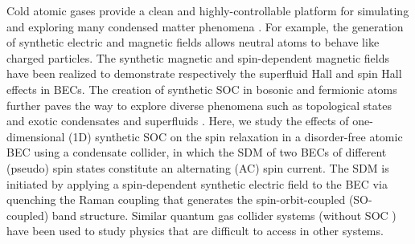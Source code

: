 \documentclass[showpacs,preprintnumbers,amsmath,amssymb, superscriptaddress, aps, reprint]{revtex4-1}
\begin{document}
{Cold atomic gases provide a clean and highly-controllable \cite{Bloch_RevModPhys2008} platform for simulating and exploring many condensed matter phenomena \cite{Bloch_RevModPhys2008,Dalibard_gaugefield_RevModPhys,Spielman_Review, Bloch_Nature_review_2012, Zhai_Review}. For example, the generation of synthetic electric \cite{Lin_E_NP_2011} and magnetic \cite{Lin_Magnetic_Nature_2009} fields allows neutral atoms to behave like charged particles. The synthetic magnetic and spin-dependent magnetic fields have been realized to demonstrate respectively the superfluid Hall \cite{LeBlanc_SFHall_PNAS2012} and spin Hall effects \cite{Beeler_SHE_Nature_2013} in BECs. The creation of synthetic SOC in bosonic \cite{Lin_SOC_Nature_2011,zhang_dipole_PRL_2012,Qu_PhysRevA2013,Olson_LZ_PhysRevA2014,2DSOC_Science} and fermionic \cite{Wang_SOCFermi_PhysRevLett2012,SpinInjection_PhysRevLett2012,2DSOC_Fermi2016,SOC_OL_2017} atoms further paves the way to explore diverse phenomena such as topological states \cite{TopologicalMatter_NPhy2016} and exotic condensates and superfluids \cite{SOC_Wu_ChinesePL2011,HuiHu_SOCBEC_PRL2012,ExoticSuperfluid_EPL,Zhai_Review,Stringari_SFdensity_PRA2016,Stringari_vorticity_SOCBEC_PRL2017}. Here, we study the effects of one-dimensional (1D) synthetic SOC on the spin relaxation in a disorder-free atomic BEC using a condensate collider, in which the SDM \cite{SDM_Fermi_PhysRevA1999} of two BECs of different (pseudo) spin states constitute an alternating (AC) spin current. The SDM is initiated by applying a spin-dependent synthetic electric field to the BEC via quenching the Raman coupling that generates the spin-orbit-coupled (SO-coupled) band structure. Similar quantum gas collider systems (without SOC \cite{NewtonCradle_Nature2006,Dark-Bright_Soliton_PRL2011,Sommer_Nature_2011, Collision_soliton_NPhy2014,Spin_Superfluidity_PRL2018}) have been used to study physics that are difficult to access in other systems.

}
\end{document}
